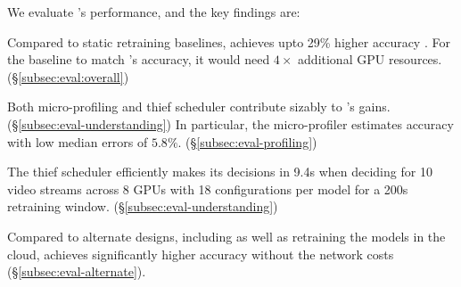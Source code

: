 We evaluate \name's performance, and the key findings are:

{} Compared to static retraining baselines, \name achieves upto 29\% higher accuracy 
. 
For the baseline to match \name's accuracy, it would need $4\times$ additional GPU resources. (\S\ref{subsec:eval:overall}) %

 Both micro-profiling and thief scheduler contribute sizably to \name's gains. (\S\ref{subsec:eval-understanding}) 
In particular, the micro-profiler estimates accuracy with low median errors of $5.8\%$. %
(\S\ref{subsec:eval-profiling})

 The thief scheduler efficiently makes its decisions in 9.4s when deciding for 10 video streams across 8 GPUs with 18 configurations per model for a 200s retraining window. (\S\ref{subsec:eval-understanding})

 Compared to alternate designs, 
including  as well as retraining the models in the cloud,
\name achieves significantly higher accuracy without the network costs (\S\ref{subsec:eval-alternate}).


